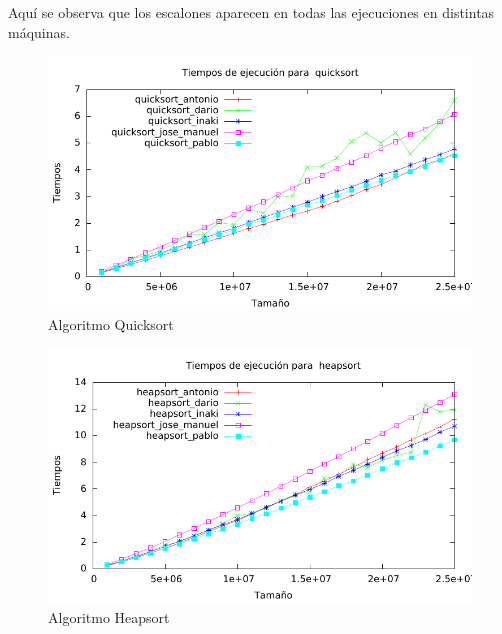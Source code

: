 \documentclass[a4paper, 11pt]{article}
\begin{document}
Aquí se observa que los escalones aparecen en todas las ejecuciones en distintas
máquinas.

\begin{figure}[H] \includegraphics[width=15cm]{quicksort_todos_g} \centering
   \caption{Algoritmo Quicksort} \end{figure}

\begin{figure}[H] \includegraphics[width=15cm]{heapsort_todos_g} \centering
   \caption{Algoritmo Heapsort} \end{figure}

\newpage
\end{document}
